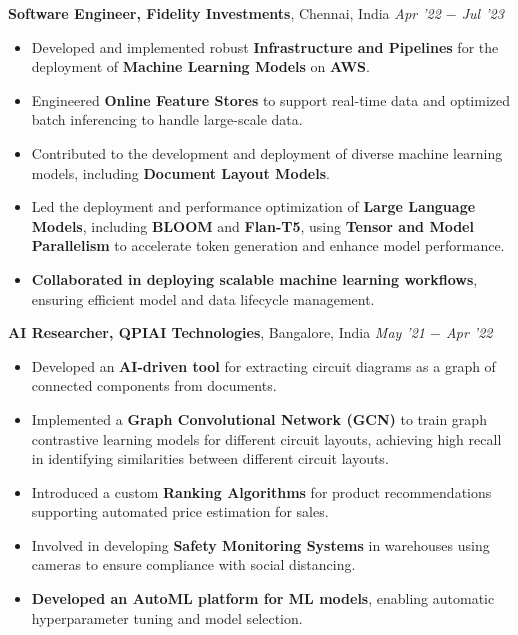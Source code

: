 \documentclass[10pt,a4]{article}
\begin{document}
{\begin{flushleft}
    \vspace{0.5mm}
    \hspace{1.5mm} \textbf{\large Software Engineer, Fidelity Investments},  Chennai, India \hfill \textit{\large Apr '22 $-$ Jul '23}	\\
    \begin{itemize}
        \item Developed and implemented robust \textbf{Infrastructure and Pipelines} for the deployment of \textbf{Machine Learning Models} on \textbf{AWS}.
         \item Engineered \textbf{Online Feature Stores} to support real-time data and optimized batch inferencing to handle large-scale data.
         \item Contributed to the development and deployment of diverse machine learning models, including \textbf{Document Layout Models}.
         \item Led the deployment and performance optimization of \textbf{Large Language Models}, including \textbf{BLOOM} and \textbf{Flan-T5}, using \textbf{Tensor and Model Parallelism} to accelerate token generation and enhance model performance.
        \item \textbf{Collaborated in deploying scalable machine learning workflows}, ensuring efficient model and data lifecycle management.
    \end{itemize}

    \vspace{0.5mm}
    \hspace{1.5mm} \textbf{\large AI Researcher, QPIAI Technologies},  Bangalore, India \hfill \textit{\large May '21 $-$ Apr '22}	\\
    \begin{itemize}

        \item Developed an \textbf{AI-driven tool} for extracting circuit diagrams as a graph of connected components from documents.
        \item Implemented a \textbf{Graph Convolutional Network (GCN)} to train graph contrastive learning models for different circuit layouts, achieving high recall in identifying similarities between different circuit layouts.
        \item Introduced a custom \textbf{Ranking Algorithms} for product recommendations supporting automated price estimation for sales.
        \item Involved in developing \textbf{Safety Monitoring Systems} in warehouses using cameras to ensure compliance with social distancing.
        \item \textbf{Developed an AutoML platform for ML models}, enabling automatic hyperparameter tuning and model selection.
    \end{itemize}


\end{flushleft}}
\end{document}
